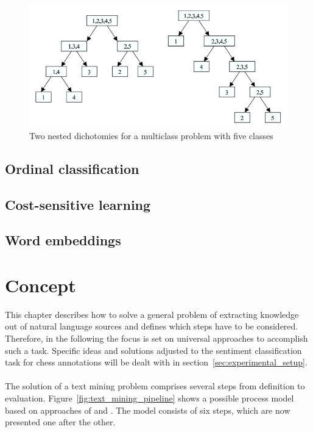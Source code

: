 \documentclass[article,type=msc,colorback,accentcolor=tud7b]{tudthesis}
\begin{document}
    \begin{figure}[H]
      \centering
      \includegraphics{images/nested_dichotomies}
      \caption[Two nested dichotomies]{Two nested dichotomies for a multiclass problem with five classes \autocite{Dong2005}\protect\footnotemark}
      \label{fig:nested_dichotomies}
    \end{figure}

  \subsection{Ordinal classification}
  \label{subsec:ordinal_classification}
  
  \subsection{Cost-sensitive learning}
  \label{subsec:cost_sensitive_learning}

  \subsection{Word embeddings}
  \label{subsec:word_embeddings}
  \clearpage
  
  \section{Concept}
  
    This chapter describes how to solve a general problem of extracting knowledge out of natural language sources and defines which steps have to be considered. Therefore, in the following the focus is set on universal approaches to accomplish such a task. Specific ideas and solutions adjusted to the sentiment classification task for chess annotations will be dealt with in section~\ref{sec:experimental_setup}. \\\\
    The solution of a text mining problem comprises several steps from definition to evaluation. Figure~\ref{fig:text_mining_pipeline} shows a possible process model based on approaches of \citeauthor{Schieber2014} \autocite{Schieber2014} and \citeauthor{Kwartler2017} \autocite{Kwartler2017}. The model consists of six steps, which are now presented one after the other.
    
\end{document}
